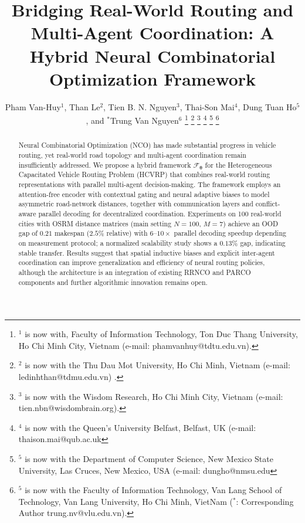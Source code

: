 \documentclass[journal,twoside,web]{ieeecolor}
\theoremstyle{definition}
\theoremstyle{remark}
\theoremstyle{definition}
\begin{document}
\title{Bridging Real-World Routing and Multi-Agent
Coordination: A Hybrid Neural Combinatorial
Optimization Framework}
\author{Pham Van-Huy$^{1}$, Than Le$^{2}$,  Tien B. N. Nguyen$^{3}$, Thai-Son Mai$^{4}$, Dung Tuan Ho$^{5}$,  and $^{*}$Trung Van Nguyen$^{6}$ 
\thanks{$^{1}$ is now with, Faculty of Information Technology, Ton Duc Thang University, Ho Chi Minh City, Vietnam (e-mail: phamvanhuy@tdtu.edu.vn).}
\thanks{$^{2}$  is now with the Thu Dau Mot University, Ho Chi Minh,  Vietnam (e-mail: ledinhthan@tdmu.edu.vn)
.}
\thanks{$^{3}$ is now with the Wisdom Research, Ho Chi Minh City,  Vietnam (e-mail: tien.nbn@wisdombrain.org). }
\thanks{$^{4}$ is now with the Queen's University Belfast, Belfast, UK (e-mail: thaison.mai@qub.ac.uk}
\thanks{$^{5}$ is now with the Department of Computer Science, New Mexico State University, Las Cruces, New Mexico, USA (e-mail: dungho@nmsu.edu}
\thanks{$^{5}$ is now with the Faculty of Information Technology, Van Lang School of Technology, Van Lang University, Ho Chi Minh, VietNam ($^{*}$: Corresponding Author trung.nv@vlu.edu.vn).}}

\maketitle

\begin{abstract}
Neural Combinatorial Optimization (NCO) has made substantial progress in vehicle routing, yet real-world road topology and multi-agent coordination remain insufficiently addressed. We propose a hybrid framework $\mathcal{F}_{\boldsymbol{\theta}}$ for the Heterogeneous Capacitated Vehicle Routing Problem (HCVRP) that combines real-world routing representations with parallel multi-agent decision-making. The framework employs an attention-free encoder with contextual gating and neural adaptive biases to model asymmetric road-network distances, together with communication layers and conflict-aware parallel decoding for decentralized coordination. Experiments on 100 real-world cities with OSRM distance matrices (main setting $N{=}100$, $M{=}7$) achieve an OOD gap of $0.21$ makespan ($2.5\%$ relative) with $6$--$10\times$ parallel decoding speedup depending on measurement protocol; a normalized scalability study shows a $0.13\%$ gap, indicating stable transfer. Results suggest that spatial inductive biases and explicit inter-agent coordination can improve generalization and efficiency of neural routing policies, although the architecture is an integration of existing RRNCO and PARCO components and further algorithmic innovation remains open.
\end{abstract}
\end{document}
